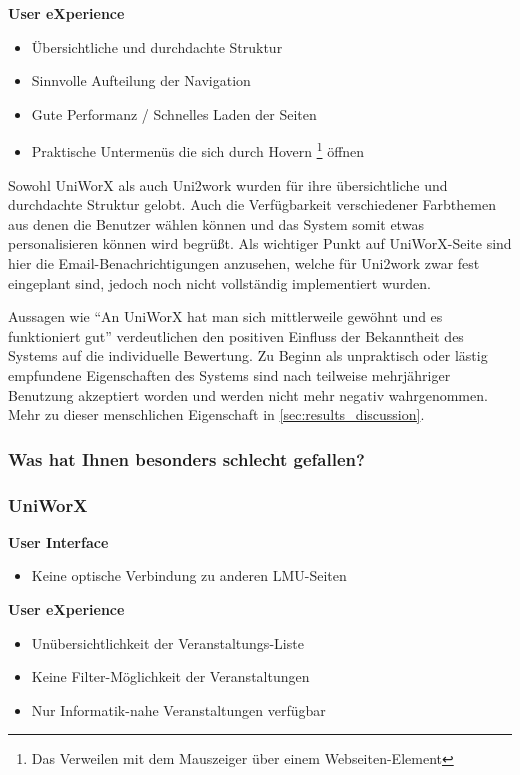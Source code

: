 \documentclass[11pt,a4paper,twoside,ngerman]{article}
\begin{document}
\noindent\hspace{6mm}\textbf{User eXperience}
\begin{itemize}
    \item Übersichtliche und durchdachte Struktur
    \item Sinnvolle Aufteilung der Navigation
    \item Gute Performanz / Schnelles Laden der Seiten
    \item Praktische Untermenüs die sich durch Hovern \footnote{Das Verweilen mit dem Mauszeiger über einem Webseiten-Element} öffnen
\end{itemize}

\noindent
Sowohl UniWorX als auch Uni2work wurden für ihre übersichtliche und durchdachte Struktur gelobt. Auch die Verfügbarkeit verschiedener Farbthemen aus denen die Benutzer wählen können und das System somit etwas personalisieren können wird begrüßt.
Als wichtiger Punkt auf UniWorX-Seite sind hier die Email-Benachrichtigungen anzusehen, welche für Uni2work zwar fest eingeplant sind, jedoch noch nicht vollständig implementiert wurden.

Aussagen wie "`An UniWorX hat man sich mittlerweile gewöhnt und es funktioniert gut"' verdeutlichen den positiven Einfluss der Bekanntheit des Systems auf die individuelle Bewertung. Zu Beginn als unpraktisch oder lästig empfundene Eigenschaften des Systems sind nach teilweise mehrjähriger Benutzung akzeptiert worden und werden nicht mehr negativ wahrgenommen. Mehr zu dieser menschlichen Eigenschaft in \autoref{sec:results_discussion}.

\subsubsection{Was hat Ihnen besonders schlecht gefallen?}
\subsubsection*{UniWorX}
\hspace{6mm}\textbf{User Interface}
\begin{itemize}
    \item Keine optische Verbindung zu anderen LMU-Seiten
\end{itemize}
    
\noindent\hspace{6mm}\textbf{User eXperience}
\begin{itemize}
    \item Unübersichtlichkeit der Veranstaltungs-Liste
    \item Keine Filter-Möglichkeit der Veranstaltungen
    \item Nur Informatik-nahe Veranstaltungen verfügbar
\end{itemize}
\end{document}
